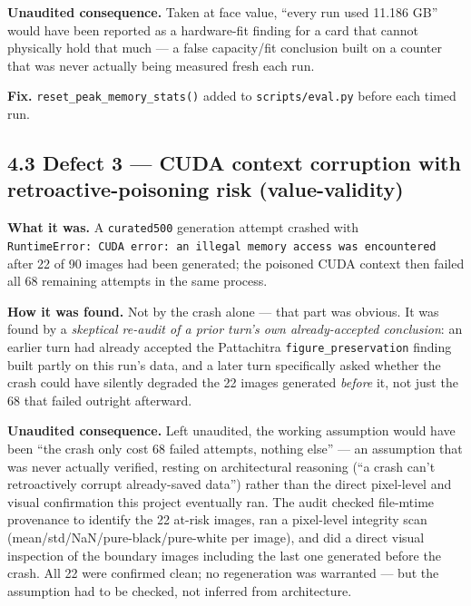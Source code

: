 \textbf{Unaudited consequence.} Taken at face value, ``every run used
11.186 GB'' would have been reported as a hardware-fit finding for a
card that cannot physically hold that much --- a false capacity/fit
conclusion built on a counter that was never actually being measured
fresh each run.

\textbf{Fix.} \texttt{reset\_peak\_memory\_stats()} added to
\texttt{scripts/eval.py} before each timed run.

\hypertarget{defect-3-cuda-context-corruption-with-retroactive-poisoning-risk-value-validity}{%
\subsection{4.3 Defect 3 --- CUDA context corruption with
retroactive-poisoning risk
(value-validity)}\label{defect-3-cuda-context-corruption-with-retroactive-poisoning-risk-value-validity}}

\textbf{What it was.} A \texttt{curated500} generation attempt crashed
with
\texttt{RuntimeError:\ CUDA\ error:\ an\ illegal\ memory\ access\ was\ encountered}
after 22 of 90 images had been generated; the poisoned CUDA context then
failed all 68 remaining attempts in the same process.

\textbf{How it was found.} Not by the crash alone --- that part was
obvious. It was found by a \emph{skeptical re-audit of a prior turn's
own already-accepted conclusion}: an earlier turn had already accepted
the Pattachitra \texttt{figure\_preservation} finding built partly on
this run's data, and a later turn specifically asked whether the crash
could have silently degraded the 22 images generated \emph{before} it,
not just the 68 that failed outright afterward.

\textbf{Unaudited consequence.} Left unaudited, the working assumption
would have been ``the crash only cost 68 failed attempts, nothing else''
--- an assumption that was never actually verified, resting on
architectural reasoning (``a crash can't retroactively corrupt
already-saved data'') rather than the direct pixel-level and visual
confirmation this project eventually ran. The audit checked file-mtime
provenance to identify the 22 at-risk images, ran a pixel-level
integrity scan (mean/std/NaN/pure-black/pure-white per image), and did a
direct visual inspection of the boundary images including the last one
generated before the crash. All 22 were confirmed clean; no regeneration
was warranted --- but the assumption had to be checked, not inferred
from architecture.

